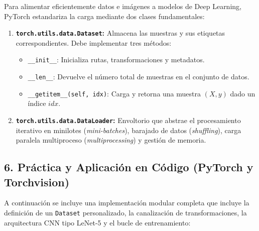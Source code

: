 Para alimentar eficientemente datos e imágenes a modelos de Deep Learning, PyTorch estandariza la carga mediante dos clases fundamentales:

\begin{enumerate}
	\item \textbf{\texttt{torch.utils.data.Dataset}:} Almacena las muestras y sus etiquetas correspondientes. Debe implementar tres métodos:
	\begin{itemize}
		\item \texttt{\_\_init\_\_}: Inicializa rutas, transformaciones y metadatos.
		\item \texttt{\_\_len\_\_}: Devuelve el número total de muestras en el conjunto de datos.
		\item \texttt{\_\_getitem\_\_(self, idx)}: Carga y retorna una muestra $(X, y)$ dado un índice $idx$.
	\end{itemize}
	\item \textbf{\texttt{torch.utils.data.DataLoader}:} Envoltorio que abstrae el procesamiento iterativo en minilotes (\emph{mini-batches}), barajado de datos (\emph{shuffling}), carga paralela multiproceso (\emph{multiprocessing}) y gestión de memoria.
\end{enumerate}

\subsection{6. Práctica y Aplicación en Código (PyTorch y Torchvision)}

A continuación se incluye una implementación modular completa que incluye la definición de un \texttt{Dataset} personalizado, la canalización de transformaciones, la arquitectura CNN tipo LeNet-5 y el bucle de entrenamiento:

